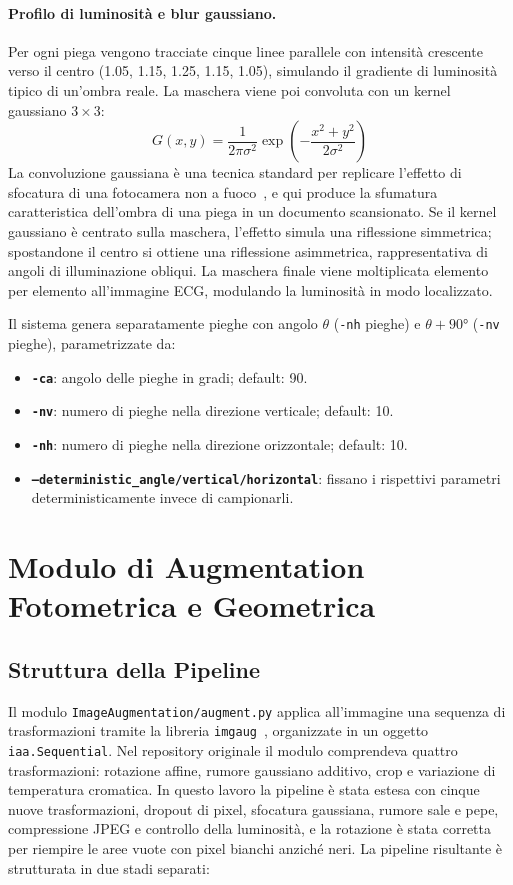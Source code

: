 \paragraph{Profilo di luminosità e blur gaussiano.} Per ogni piega vengono tracciate cinque linee parallele con intensità crescente verso il centro (1.05, 1.15, 1.25, 1.15, 1.05), simulando il gradiente di luminosità tipico di un'ombra reale. La maschera viene poi convoluta con un kernel gaussiano $3\times3$:
\[
G(x,y) = \frac{1}{2\pi\sigma^2} \exp\!\left(-\frac{x^2+y^2}{2\sigma^2}\right)
\]
La convoluzione gaussiana è una tecnica standard per replicare l'effetto di sfocatura di una fotocamera non a fuoco~\cite{dodge2016understanding}, e qui produce la sfumatura caratteristica dell'ombra di una piega in un documento scansionato. Se il kernel gaussiano è centrato sulla maschera, l'effetto simula una riflessione simmetrica; spostandone il centro si ottiene una riflessione asimmetrica, rappresentativa di angoli di illuminazione obliqui. La maschera finale viene moltiplicata elemento per elemento all'immagine ECG, modulando la luminosità in modo localizzato.

Il sistema genera separatamente pieghe con angolo $\theta$ (\texttt{-nh} pieghe) e $\theta + 90°$ (\texttt{-nv} pieghe), parametrizzate da:

\begin{itemize}
    \item \textbf{\texttt{-ca}}: angolo delle pieghe in gradi; default: 90.
    \item \textbf{\texttt{-nv}}: numero di pieghe nella direzione verticale; default: 10.
    \item \textbf{\texttt{-nh}}: numero di pieghe nella direzione orizzontale; default: 10.
    \item \textbf{\texttt{--deterministic\_angle/vertical/horizontal}}: fissano i rispettivi parametri deterministicamente invece di campionarli.
\end{itemize}

\section{Modulo di Augmentation Fotometrica e Geometrica}

\subsection{Struttura della Pipeline}

Il modulo \texttt{ImageAugmentation/augment.py} applica all'immagine una sequenza di trasformazioni tramite la libreria \texttt{imgaug}~\cite{imgaug}, organizzate in un oggetto \texttt{iaa.Sequential}. Nel repository originale il modulo comprendeva quattro trasformazioni: rotazione affine, rumore gaussiano additivo, crop e variazione di temperatura cromatica. In questo lavoro la pipeline è stata estesa con cinque nuove trasformazioni, dropout di pixel, sfocatura gaussiana, rumore sale e pepe, compressione JPEG e controllo della luminosità, e la rotazione è stata corretta per riempire le aree vuote con pixel bianchi anziché neri. La pipeline risultante è strutturata in due stadi separati:

